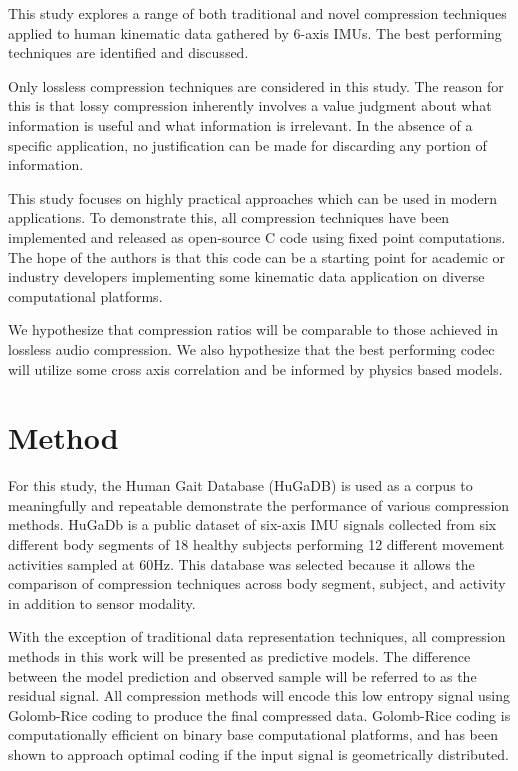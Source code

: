 \documentclass[journal]{IEEEtran}
\begin{document}
This study explores a range of both traditional and novel compression techniques applied to human kinematic data gathered by 6-axis IMUs. The best performing techniques are identified and discussed. 

Only lossless compression techniques are considered in this study. The reason for this is that lossy compression inherently involves a value judgment about what information is useful and what information is irrelevant. In the absence of a specific application, no justification can be made for discarding any portion of information.

This study focuses on highly practical approaches which can be used in modern applications. To demonstrate this, all compression techniques have been implemented and released as open-source C code using fixed point computations. The hope of the authors is that this code can be a starting point for academic or industry developers implementing some kinematic data application on diverse computational platforms.

We hypothesize that compression ratios will be comparable to those achieved in lossless audio compression. We also hypothesize that the best performing codec will utilize some cross axis correlation and be informed by physics based models.

\section{Method}
For this study, the Human Gait Database (HuGaDB)\cite{Chereshnev2018} is used as a corpus to meaningfully and repeatable demonstrate the performance of various compression methods. HuGaDb is a public dataset of six-axis IMU signals collected from six different body segments of 18 healthy subjects performing 12 different movement activities sampled at 60Hz. This database was selected because it allows the comparison of compression techniques across body segment, subject, and activity in addition to sensor modality.

With the exception of traditional data representation techniques, all compression methods in this work will be presented as predictive models. The difference between the model prediction and observed sample will be referred to as the residual signal. All compression methods will encode this low entropy signal using Golomb-Rice coding to produce the final compressed data. Golomb-Rice coding is computationally efficient on binary base computational platforms, and has been shown to approach optimal coding if the input signal is geometrically distributed\cite{Golomb1966}\cite{F.Rice1979}.
\end{document}
